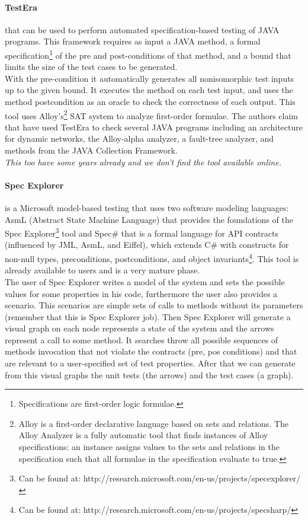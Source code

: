 \documentclass[citeauthoryear]{llncs}
\begin{document}
\paragraph{\textbf{TestEra}\cite{testera}}
that can be used to perform automated specification-based testing of
JAVA programs. This framework requires as input a JAVA method, a formal specification\footnote{Specifications are first-order logic formulae.}
of the pre and post-conditions of that method, and
a bound that limits the size of the test cases to be generated.\\
With the pre-condition it automatically generates all nonisomorphic test inputs up to the given bound.
It executes the method on each test input, and uses the method postcondition as an oracle to check the correctness of each output. This tool
uses Alloy's\footnote{Alloy is a first-order declarative language based on sets and relations. The Alloy Analyzer is a fully
automatic tool that finds instances of Alloy specifications: an instance
assigns values to the sets and relations in the specification such that
all formulae in the specification evaluate to true.}
SAT system to analyze first-order  formulae.
The authors claim that have used TestEra to check several JAVA programs including an architecture for
dynamic networks, the Alloy-alpha analyzer, a fault-tree analyzer, and methods from the JAVA Collection Framework.\\
\textit{This too have some years already and we don't find the tool available online.}

\paragraph{\textbf{Spec Explorer}} is a Microsoft model-based testing that uses two software modeling languages:
AsmL (Abstract State Machine Language) that provides the foundations of the Spec Explorer\footnote{Can be found at: http://research.microsoft.com/en-us/projects/specexplorer/} tool
and Spec\# that is a formal language for API contracts (influenced by JML, AsmL, and Eiffel), which extends C\# with constructs for non-null types,
preconditions, postconditions, and object invariants\footnote{Can be found at: http://research.microsoft.com/en-us/projects/specsharp/}.
This tool is already available to users and is a very mature phase.\\

The user of Spec Explorer writes a model of the system and sets the possible values for some properties in his code, furthermore the user also provides a scenario.
This scenarios are simple sets of calls to methods without its parameters (remember that this is Spec Explorer job).
Then Spec Explorer will generate a visual graph on each node represents a state of the system and the arrows represent a call to some method.
It searches throw all possible sequences of methods invocation that not violate the contracts (pre, pos conditions) and
that are relevant to a user-specified set of test properties. After that we can generate from this visual graphs the unit tests (the arrows) and the
test cases (a graph).
\end{document}
